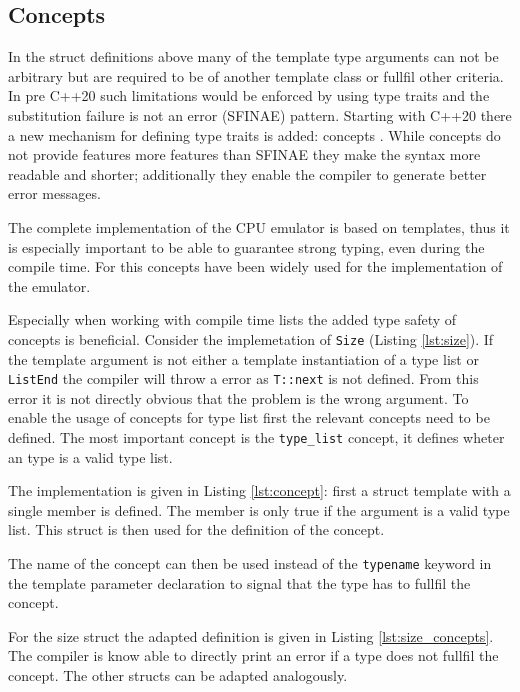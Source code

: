 

\subsection{Concepts}
In the struct definitions above many of the template type arguments can not be arbitrary
but are required to be of another template class or fullfil other criteria. In pre C++20
such limitations would be enforced by using type traits and the substitution failure is 
not an error (SFINAE) pattern.
Starting with C++20 there a new mechanism for defining type traits is added: concepts .
While concepts do not provide features more features than SFINAE
they make the syntax more readable and shorter; additionally they enable the compiler to
generate better error messages.

The complete implementation of the CPU emulator is based on templates, thus it is especially important to be able to guarantee strong typing, even during the compile time. For this
concepts have been widely used for the implementation of the emulator.

Especially when working with compile time lists the added type safety of concepts is
beneficial. Consider the implemetation of \lstinline{Size} (Listing \ref{lst:size}).
If the template argument is not either a template instantiation of a type list or 
\lstinline{ListEnd} the compiler will throw a error as \lstinline{T::next} is not
defined. From this error it is not directly obvious that the problem is the wrong
argument. To enable the usage of concepts for type list first the relevant concepts
need to be defined. The most important concept is the \lstinline{type_list} concept,
it defines wheter an type is a valid type list.

The implementation is given in Listing \ref{lst:concept}: first a struct template with
a single member is defined. The member is only true if the argument is a valid type list.
This struct is then used for the definition of the concept.



The name of the concept can then be used instead of the \lstinline{typename} keyword 
in the template parameter declaration to  signal that the type has to fullfil the concept. 

For the size struct the adapted definition is given in Listing \ref{lst:size_concepts}. The compiler is know able to directly print an error if a type does not fullfil the concept.
The other structs can be adapted analogously.


